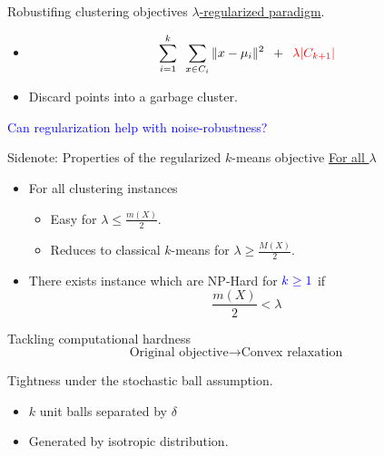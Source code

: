 \documentclass{beamer}
\begin{document}
\begin{frame}[label=detailsOptimizationNoise]{Robustifing clustering objectives}
	\hyperlink{optimizationNoise}{$\lambda$-regularized paradigm}.
	\begin{itemize}
		\vspace{5pt}\item $$\sum_{i =1}^k\enspace\sum_{x \in C_i} \|x - \mu_i\|^2 \enspace+\enspace \textcolor{red}{\lambda |C_{k+1}|}$$
		\vspace{20pt}\item Discard points into a garbage cluster.
	\end{itemize}
	
	\vspace{20pt}\textcolor{blue}{Can regularization help with noise-robustness?}
\end{frame}

\begin{frame}{Sidenote: Properties of the regularized $k$-means objective}	
	\hyperlink{optimizationNoise}{For all $\lambda$}
	\begin{itemize}
		\item For all clustering instances 
		\begin{itemize}
			\vspace{10pt}\item Easy for $\lambda \le \frac{m(X)}{2}$.
			\vspace{10pt}\item Reduces to classical $k$-means for $\lambda \ge \frac{M(X)}{2}$.			
		\end{itemize}
		\vspace{20pt}\item There exists instance which are NP-Hard for $\textcolor{blue}{k \ge 1}$ if $$\frac{m(X)}{2} < \lambda$$
	\end{itemize}
\end{frame}

\begin{frame}{Tackling computational hardness}
	$$\text{Original objective} \longrightarrow \text{Convex relaxation}$$
	
	\vspace{20pt}Tightness under the {\color{blue}stochastic ball assumption}.
	\begin{itemize}
		\vspace{10pt}\item $k$ unit balls separated by $\delta$
		\vspace{10pt}\item Generated by isotropic distribution. 
	\end{itemize}	
\end{frame}
\end{document}
